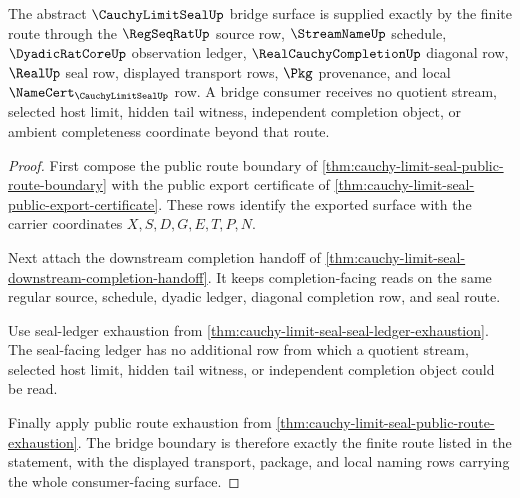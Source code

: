 \begin{theorem}
\label{thm:cauchy-limit-seal-bridge-boundary}
The abstract $\CauchyLimitSealUp$ bridge surface is supplied exactly by the finite route through the $\RegSeqRatUp$ source row, $\StreamNameUp$ schedule, $\DyadicRatCoreUp$ observation ledger, $\RealCauchyCompletionUp$ diagonal row, $\RealUp$ seal row, displayed transport rows, $\Pkg$ provenance, and local $\NameCert_{\CauchyLimitSealUp}$ row. A bridge consumer receives no quotient stream, selected host limit, hidden tail witness, independent completion object, or ambient completeness coordinate beyond that route.
\end{theorem}
\begin{proof}
First compose the public route boundary of \autoref{thm:cauchy-limit-seal-public-route-boundary} with the public export certificate of \autoref{thm:cauchy-limit-seal-public-export-certificate}. These rows identify the exported surface with the carrier coordinates $X,S,D,G,E,T,P,N$.

Next attach the downstream completion handoff of \autoref{thm:cauchy-limit-seal-downstream-completion-handoff}. It keeps completion-facing reads on the same regular source, schedule, dyadic ledger, diagonal completion row, and seal route.

Use seal-ledger exhaustion from \autoref{thm:cauchy-limit-seal-seal-ledger-exhaustion}. The seal-facing ledger has no additional row from which a quotient stream, selected host limit, hidden tail witness, or independent completion object could be read.

Finally apply public route exhaustion from \autoref{thm:cauchy-limit-seal-public-route-exhaustion}. The bridge boundary is therefore exactly the finite route listed in the statement, with the displayed transport, package, and local naming rows carrying the whole consumer-facing surface.
\end{proof}

